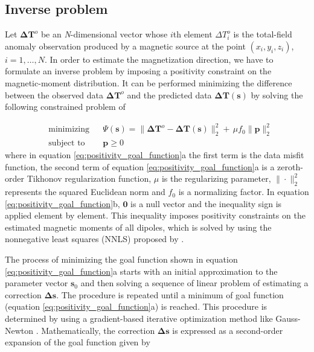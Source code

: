 \subsection{Inverse problem}

Let $\mathbf{\Delta T}^o$ be an \textit{N}-dimensional vector whose $i$th element $\Delta T_i^o$ is the total-field anomaly observation produced by a magnetic source at the point $(x_i,y_i,z_i)$, $i = 1, \ldots, N$. In order to estimate the magnetization direction, we have to formulate an inverse problem by imposing a positivity constraint on the magnetic-moment distribution. It can be performed minimizing the difference between the observed data $\mathbf{\Delta T}^o$ and the predicted data $\mathbf{\Delta T} (\mathbf{s})$ by solving the following constrained problem of

\begin{subequations}
\begin{align}
& \text{minimizing}
& &\Psi(\mathbf{s}) =\lVert \mathbf{\Delta T}^o - \mathbf{\Delta T} (\mathbf{s}) \rVert_{2}^{2} + \, \mu f_0 \parallel \mathbf{p} \parallel_{2}^{2} \\
& \text{subject to}
& & \mathbf{p} \geqslant 0
\end{align}
\label{eq:positivity_goal_function}
\end{subequations}
where in equation \ref{eq:positivity_goal_function}a the first term is the data misfit function, the second term of equation \ref{eq:positivity_goal_function}a is a zeroth-order Tikhonov regularization function, $\mu$ is the regularizing parameter, $\| \cdot \|_{2}^{2}$ represents the squared Euclidean norm and $f_0$ is a normalizing factor. In equation \ref{eq:positivity_goal_function}b, $\mathbf{0}$ is a null vector and the inequality sign is applied element by element. This inequality imposes positivity constraints on the estimated magnetic moments of all dipoles, which is solved by using the nonnegative least squares (NNLS) proposed by \cite{lawson_hanson_1974}. 

The process of minimizing the goal function shown in equation \ref{eq:positivity_goal_function}a starts with an initial approximation to the parameter vector $\mathbf{s}_0$ and then solving a sequence of linear problem of estimating a correction $\mathbf{\Delta s}$. The procedure is repeated until a minimum of goal function (equation \ref{eq:positivity_goal_function}a) is reached. This procedure is determined by using a gradient-based iterative optimization method like Gauss-Newton \citep{aster2005}. Mathematically, the correction $\mathbf{\Delta s}$ is expressed as a second-order expansion of the goal function given by     

